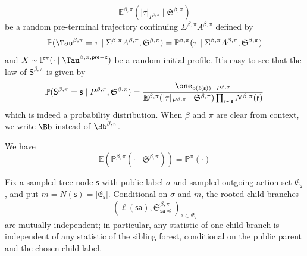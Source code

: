 \documentclass[12pt, a4paper]{article}
\begin{document}
\begin{definition}
\[       {\mathbb{E}^{\beta, \pi}(|\tau|_{P^{\beta,\pi}} \mid \mathfrak{S}^{\beta, \pi})}
\]
be a random pre-terminal trajectory continuing $\Sigma^{\beta, \pi} A^{\beta, \pi}$ defined by
\begin{equation}\label{eq:branched-continuation-law}
  \mathbb{P}(\Tau^{\beta, \pi} = \tau \mid \Sigma^{\beta, \pi} A^{\beta, \pi}, \mathfrak{S}^{\beta, \pi})
  = \mathbb{P}^{\beta, \pi}(\tau \mid \Sigma^{\beta, \pi} A^{\beta, \pi}, \mathfrak{S}^{\beta, \pi})
\end{equation} 
and $X \sim \mathbb{P}^\pi(\cdot \mid \Tau^{\beta, \pi, \mathsf{pre-c}})$ be a random initial profile.
It's easy to see that the law of $\mathsf{S}^{\beta, \pi}$ is given by
\begin{equation}\label{eq:branched-stationary-node-law}
  \mathbb{P}(\mathsf{S}^{\beta,\pi} = \mathsf{s} \mid P^{\beta, \pi}, \mathfrak{S}^{\beta, \pi})
  = \frac{\one_{o(\ell(\mathsf{s})) = P^{\beta, \pi}}}
         {\mathbb{E}^{\beta, \pi}(|\tau|_{P^{\beta, \pi}} \mid \mathfrak{S}^{\beta, \pi}) \prod_{\mathsf{r} \prec \mathsf{s}} N^{\beta,\pi}(\mathsf{r})}
\end{equation}
which is indeed a probability distribution.
When $\beta$ and $\pi$ are clear from context, we write $\Bb$ instead of $\Bb^{\beta, \pi}$.
\end{definition}

\begin{lemma}\label{lem:branched-terminal-distribution}
    We have
    \begin{equation}\label{eq:branched-terminal-distribution}
        \mathbb{E}(\mathbb{P}^{\beta, \pi}(\cdot \mid \mathfrak{S}^{\beta, \pi})) = \mathbb{P}^\pi(\cdot)
    \end{equation}
\end{lemma}

\begin{lemma}\label{lem:branched-branch-independence}
    Fix a sampled-tree node $\mathsf{s}$ with public label $\sigma$ and sampled outgoing-action set $\mathfrak{E}_{\mathsf{s}}$, and put $m=N(\mathsf{s})=|\mathfrak{E}_{\mathsf{s}}|$.
    Conditional on $\sigma$ and $m$, the rooted child branches
    \[
        \left(\ell(\mathsf{s}\mathsf{a}),\mathfrak{S}_{\mathsf{s}\mathsf{a}\preccurlyeq}^{\beta,\pi}\right)_{\mathsf{a}\in\mathfrak{E}_{\mathsf{s}}}
    \]
    are mutually independent; in particular, any statistic of one child branch is independent of any statistic of the sibling forest, conditional on the public parent and the chosen child label.
\end{lemma}
\end{document}
